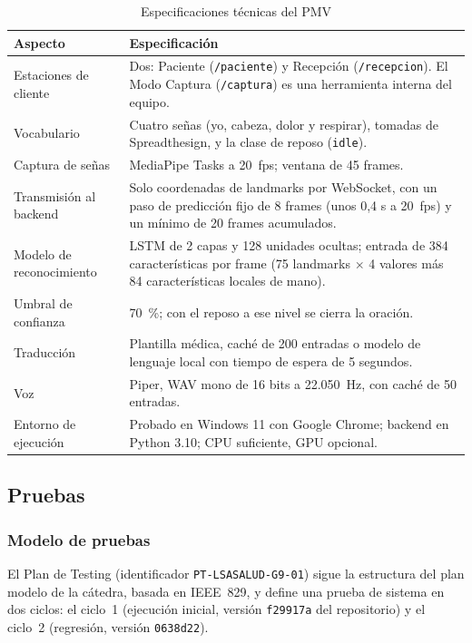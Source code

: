 \begin{table}[H]
  \centering
  \caption{Especificaciones técnicas del PMV}\label{tab:especificaciones}
  \small
  \begin{tabularx}{\textwidth}{>{\raggedright\arraybackslash}p{4.6cm} X}
    \toprule
    \textbf{Aspecto} & \textbf{Especificación} \\
    \midrule
    Estaciones de cliente & Dos: Paciente (\texttt{/paciente}) y Recepción (\texttt{/recepcion}). El Modo Captura (\texttt{/captura}) es una herramienta interna del equipo. \\
    Vocabulario & Cuatro señas (yo, cabeza, dolor y respirar), tomadas de Spreadthesign, y la clase de reposo (\texttt{idle}). \\
    Captura de señas & MediaPipe Tasks a 20~fps; ventana de 45 frames. \\
    Transmisión al backend & Solo coordenadas de landmarks por WebSocket, con un paso de predicción fijo de 8 frames (unos 0,4 s a 20~fps) y un mínimo de 20 frames acumulados. \\
    Modelo de reconocimiento & LSTM de 2 capas y 128 unidades ocultas; entrada de 384 características por frame (75 landmarks $\times$ 4 valores más 84 características locales de mano). \\
    Umbral de confianza & 70~\%; con el reposo a ese nivel se cierra la oración. \\
    Traducción & Plantilla médica, caché de 200 entradas o modelo de lenguaje local con tiempo de espera de 5 segundos. \\
    Voz & Piper, WAV mono de 16 bits a 22.050~Hz, con caché de 50 entradas. \\
    Entorno de ejecución & Probado en Windows 11 con Google Chrome; backend en Python 3.10; CPU suficiente, GPU opcional. \\
    \bottomrule
  \end{tabularx}
\end{table}

\subsection{Pruebas}

\subsubsection{Modelo de pruebas}\label{sec:modelo-pruebas}

El Plan de Testing (identificador \texttt{PT-LSASALUD-G9-01}) sigue la estructura del plan modelo de la cátedra, basada en IEEE~829, y define una prueba de sistema en dos ciclos: el ciclo~1 (ejecución inicial, versión \texttt{f29917a} del repositorio) y el ciclo~2 (regresión, versión \texttt{0638d22}).

